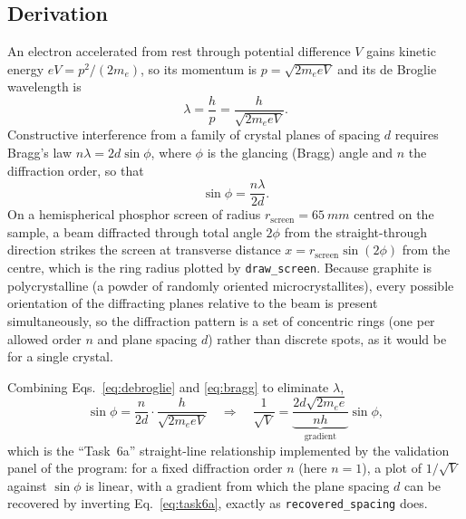 \documentclass[11pt]{article}
\begin{document}
\subsection{Derivation}
An electron accelerated from rest through potential difference $V$ gains kinetic energy $eV = p^2/(2m_e)$, so its momentum is $p=\sqrt{2m_eeV}$ and its de Broglie wavelength is
\begin{equation}
\lambda = \frac{h}{p} = \frac{h}{\sqrt{2m_eeV}}. \label{eq:debroglie}
\end{equation}
Constructive interference from a family of crystal planes of spacing $d$ requires Bragg's law $n\lambda=2d\sin\phi$, where $\phi$ is the glancing (Bragg) angle and $n$ the diffraction order, so that
\begin{equation}
\sin\phi = \frac{n\lambda}{2d}. \label{eq:bragg}
\end{equation}
On a hemispherical phosphor screen of radius $r_\text{screen}=\SI{65}{mm}$ centred on the sample, a beam diffracted through total angle $2\phi$ from the straight-through direction strikes the screen at transverse distance $x=r_\text{screen}\sin(2\phi)$ from the centre, which is the ring radius plotted by \texttt{draw\_screen}. Because graphite is polycrystalline (a powder of randomly oriented microcrystallites), every possible orientation of the diffracting planes relative to the beam is present simultaneously, so the diffraction pattern is a set of concentric rings (one per allowed order $n$ and plane spacing $d$) rather than discrete spots, as it would be for a single crystal.

Combining Eqs.~\eqref{eq:debroglie} and \eqref{eq:bragg} to eliminate $\lambda$,
\begin{equation}
\sin\phi = \frac{n}{2d}\cdot\frac{h}{\sqrt{2m_eeV}}
\quad\Longrightarrow\quad
\frac{1}{\sqrt V} = \underbrace{\frac{2d\sqrt{2m_ee}}{nh}}_{\text{gradient}}\sin\phi, \label{eq:task6a}
\end{equation}
which is the ``Task~6a'' straight-line relationship implemented by the validation panel of the program: for a fixed diffraction order $n$ (here $n=1$), a plot of $1/\sqrt V$ against $\sin\phi$ is linear, with a gradient from which the plane spacing $d$ can be recovered by inverting Eq.~\eqref{eq:task6a}, exactly as \texttt{recovered\_spacing} does.
\end{document}
